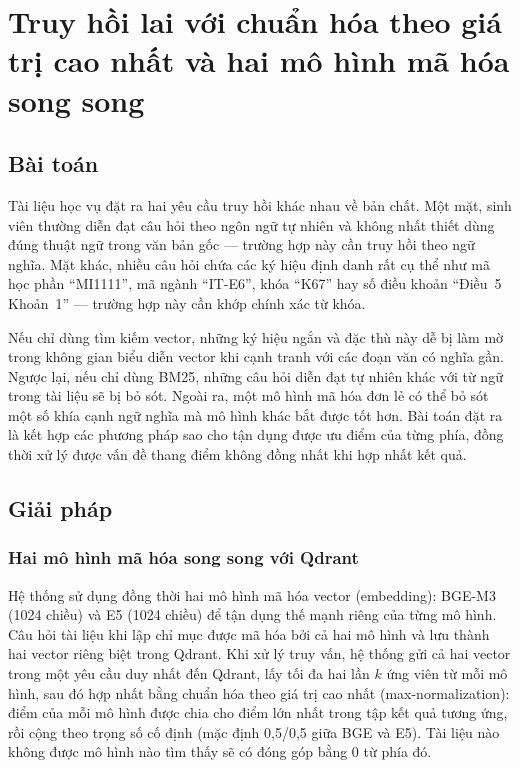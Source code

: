 \documentclass[../DoAn.tex]{subfiles}
\begin{document}
\section{Truy hồi lai với chuẩn hóa theo giá trị cao nhất và hai mô hình mã hóa song song}
\label{sec:ch5-hybrid-retrieval}

\subsection{Bài toán}

Tài liệu học vụ đặt ra hai yêu cầu truy hồi khác nhau về bản chất. Một mặt,
sinh viên thường diễn đạt câu hỏi theo ngôn ngữ tự nhiên và không nhất thiết
dùng đúng thuật ngữ trong văn bản gốc --- trường hợp này cần truy hồi theo ngữ
nghĩa. Mặt khác, nhiều câu hỏi chứa các ký hiệu định danh rất cụ thể như mã
học phần ``MI1111'', mã ngành ``IT-E6'', khóa ``K67'' hay số điều khoản ``Điều~5
Khoản~1'' --- trường hợp này cần khớp chính xác từ khóa.

Nếu chỉ dùng tìm kiếm vector, những ký hiệu ngắn và đặc thù này dễ bị làm mờ
trong không gian biểu diễn vector khi cạnh tranh với các đoạn văn có nghĩa gần.
Ngược lại, nếu chỉ dùng BM25, những câu hỏi diễn đạt tự nhiên khác với từ ngữ
trong tài liệu sẽ bị bỏ sót. Ngoài ra, một mô hình mã hóa đơn lẻ có thể bỏ
sót một số khía cạnh ngữ nghĩa mà mô hình khác bắt được tốt hơn. Bài toán đặt
ra là kết hợp các phương pháp sao cho tận dụng được ưu điểm của từng phía, đồng
thời xử lý được vấn đề thang điểm không đồng nhất khi hợp nhất kết quả.

\subsection{Giải pháp}

\subsubsection{Hai mô hình mã hóa song song với Qdrant}

Hệ thống sử dụng đồng thời hai mô hình mã hóa vector (embedding): BGE-M3 \cite{bgem3} (1024
chiều) và E5 \cite{e5model} (1024 chiều) để tận dụng thế mạnh riêng của từng mô hình. Câu hỏi tài liệu khi lập chỉ mục được mã
hóa bởi cả hai mô hình và lưu thành hai vector riêng biệt trong Qdrant. Khi xử
lý truy vấn, hệ thống gửi cả hai vector trong một yêu cầu duy nhất đến Qdrant,
lấy tối đa hai lần $k$ ứng viên từ mỗi mô hình, sau đó hợp nhất bằng chuẩn hóa
theo giá trị cao nhất (max-normalization): điểm của mỗi mô hình được chia
cho điểm lớn nhất trong tập kết quả tương ứng, rồi cộng theo trọng số cố định
(mặc định 0,5/0,5 giữa BGE và E5). Tài liệu nào không được mô hình nào tìm
thấy sẽ có đóng góp bằng 0 từ phía đó.
\end{document}
